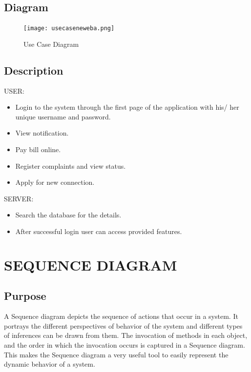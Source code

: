 \documentclass[12pt,a4paper,oneside]{report}
\begin{document}
\subsection{Diagram}
\begin{figure}[H]
  	\begin{center}
  		\texttt{[image: usecaseneweba.png]}
  			\caption{Use Case Diagram}
  			\label{Use Case Diagram}
  	\end{center}
  \end{figure}
\subsection{Description}
USER:
\begin{itemize}

\item{Login to the system through the first page of the application with his/ her unique username
and password.}
\item{View notification.}
\item{Pay bill online.}
\item{Register complaints and view status.}
\item{Apply for new connection.}
\end{itemize}
SERVER:
\begin{itemize}
\item{Search the database for the details.}
\item{After successful login user can access provided features.}
\end{itemize}

\section{SEQUENCE DIAGRAM}
\subsection{Purpose}
A Sequence diagram depicts the sequence of actions that occur in a system. It portrays the
different perspectives of behavior of the system and different types of inferences can be drawn
from them. The invocation of methods in each object, and the order in which the invocation
occurs is captured in a Sequence diagram. This makes the Sequence diagram a very useful tool
to easily represent the dynamic behavior of a system.\\
\end{document}
